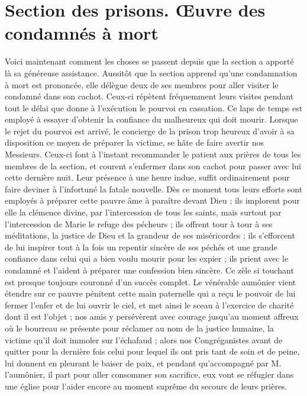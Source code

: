 \section*{Section des prisons. Œuvre des condamnés à mort}
Voici maintenant comment les choses se passent depuis que la section a apporté là sa généreuse assistance. Aussitôt que la section apprend qu'une condamnation à mort est prononcée, elle délègue deux de ses membres pour aller
visiter le condamné dans son cachot. Ceux-ci répètent fréquemment leurs visites pendant tout le délai que donne à l'exécution le pourvoi en cassation. Ce laps de temps est employé à essayer d'obtenir la confiance du malheureux qui doit mourir. Lorsque le rejet du pourvoi est arrivé, le concierge de la prison trop heureux d'avoir à sa disposition ce moyen de préparer la victime, se hâte de faire avertir nos Messieurs. Ceux-ci font à l'instant recommander le patient aux prières de tous les membres de la section, et courent s'enfermer dans son cachot pour passer avec lui cette dernière nuit. Leur présence à une heure indue, suffit ordinairement pour faire deviner à l'infortuné la fatale nouvelle. Dès ce moment tous leurs efforts sont employés à préparer cette pauvre âme à paraître devant Dieu ; ils implorent pour elle la clémence divine, par l'intercession de tous les saints, mais surtout par l'intercession de Marie le refuge des pécheurs ; ils offrent tour à tour à ses méditations, la justice de Dieu et la grandeur de ses miséricordes ; ils s'efforcent de lui inspirer tout à la fois un repentir sincère de ses péchés et une grande confiance dans celui qui a bien voulu mourir pour les expier ; ils prient avec le condamné et l'aident à préparer une confession bien sincère. Ce zèle si touchant est presque toujours couronné d'un succès complet. Le vénérable aumônier vient étendre sur ce pauvre pénitent cette main paternelle qui a reçu le pouvoir de lui fermer l'enfer et de lui ouvrir le ciel, et met ainsi le sceau à l'exercice de charité dont il est l'objet ; nos amis y persévèrent avec courage jusqu'au moment affreux où le bourreau se présente pour réclamer
au nom de la justice humaine, la victime qu'il doit immoler sur l'échafaud ; alors nos Congréganistes avant de quitter pour la dernière fois celui pour lequel ils ont pris tant de soin et de peine, lui donnent en pleurant le baiser de paix, et pendant qu'accompagné par M. l'aumônier, il part pour aller consommer son sacrifice, eux vont se réfugier dans une église pour l'aider encore au moment suprême du secours de leurs prières.

